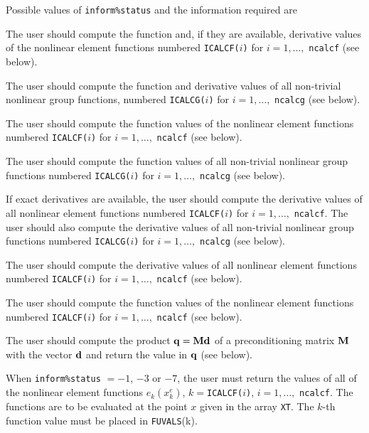 \documentclass{galahad}
\begin{document}
Possible values of {\tt inform\%status} and the information required are
\begin{description}
 The user should compute the function
     and, if they are available,
     derivative values of the nonlinear element functions
     numbered {\tt ICALCF($i$)} for $i=1, \ldots,$ {\tt ncalcf}
     (see below).

 The user should compute the function
     and derivative values of all non-trivial nonlinear group functions,
     numbered {\tt ICALCG($i$)} for $i=1, \ldots,$ {\tt ncalcg}
     (see below).

 The user should compute the
     function values
     of the nonlinear element functions
     numbered {\tt ICALCF($i$)} for $i=1, \ldots,$ {\tt ncalcf}
     (see below).

 The user should compute the function
     values of all non-trivial nonlinear group  functions
     numbered {\tt ICALCG($i$)} for $i=1, \ldots,$ {\tt ncalcg}
     (see below).

 If exact derivatives are available,
     the user should compute the
     derivative values of all nonlinear element functions
     numbered {\tt ICALCF($i$)} for $i=1, \ldots,$ {\tt ncalcf}.
     The user should also compute the derivative
     values of all non-trivial nonlinear group  functions
     numbered {\tt ICALCG($i$)} for $i=1, \ldots,$ {\tt ncalcg}
     (see below).

 The user should compute the
     derivative values of all nonlinear element functions
     numbered {\tt ICALCF($i$)} for $i=1, \ldots,$ {\tt ncalcf}
     (see below).

 The user should compute the
     function values
     of the nonlinear element functions
     numbered {\tt ICALCF($i$)} for $i=1, \ldots,$ {\tt ncalcf}
     (see below).

 The user should compute the
     product ${\mathbf{q}} = {\mathbf{M}}{\mathbf{d}}$ of a preconditioning matrix ${\mathbf{M}}$
     with the vector ${\mathbf{d}}$ and return the value in ${\mathbf{q}}$
     (see below).
\end{description}

When {\tt inform\%status} $= -1$, $-3$ or $-7$, the user must return the
values of all
of the nonlinear element functions
$e_k(x^e_k)$,
$k = ${\tt ICALCF($i$)}, $i= 1, \ldots,$ {\tt ncalcf}.
The functions are to be evaluated at the point $x$ given
in the array {\tt XT}.
The $k$-th function value must be placed in {\tt FUVALS}(k).
\end{document}
